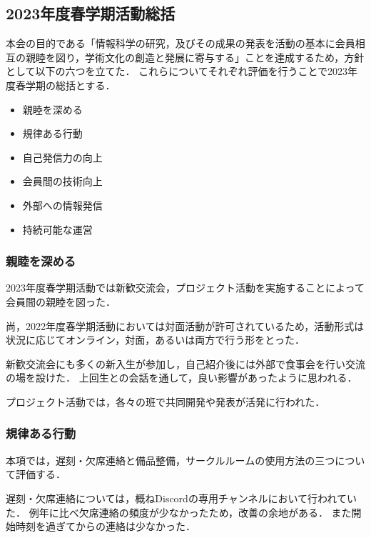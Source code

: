 \subsection*{2023年度春学期活動総括}


本会の目的である「情報科学の研究，及びその成果の発表を活動の基本に会員相互の親睦を図り，学術文化の創造と発展に寄与する」ことを達成するため，方針として以下の六つを立てた．
これらについてそれぞれ評価を行うことで2023年度春学期の総括とする．

\begin{itemize}
  \item 親睦を深める
  \item 規律ある行動
  \item 自己発信力の向上
  \item 会員間の技術向上
  \item 外部への情報発信
  \item 持続可能な運営
\end{itemize}

\subsubsection*{親睦を深める}
2023年度春学期活動では新歓交流会，プロジェクト活動を実施することによって会員間の親睦を図った．

尚，2022年度春学期活動においては対面活動が許可されているため，活動形式は状況に応じてオンライン，対面，あるいは両方で行う形をとった．

新歓交流会にも多くの新入生が参加し，自己紹介後には外部で食事会を行い交流の場を設けた．
上回生との会話を通して，良い影響があったように思われる．

プロジェクト活動では，各々の班で共同開発や発表が活発に行われた．

\subsubsection*{規律ある行動}
本項では，遅刻・欠席連絡と備品整備，サークルルームの使用方法の三つについて評価する．

遅刻・欠席連絡については，概ねDiscordの専用チャンネルにおいて行われていた．
例年に比べ欠席連絡の頻度が少なかったため，改善の余地がある．
また開始時刻を過ぎてからの連絡は少なかった．

